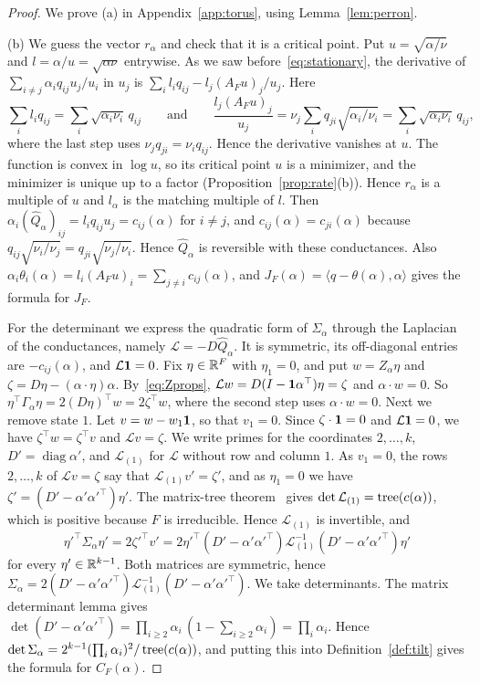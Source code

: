 \begin{proof}
We prove (a) in Appendix~\ref{app:torus}, using Lemma~\ref{lem:perron}.

(b) We guess the vector $r_\alpha$ and check that it is a critical point. Put
$u=\sqrt{\alpha/\nu}$ and $l=\alpha/u=\sqrt{\alpha\nu}$ entrywise. As we saw
before~\eqref{eq:stationary}, the derivative of $\sum_{i\ne j}\alpha_iq_{ij}u_j/u_i$ in $u_j$ is
$\sum_il_iq_{ij}-l_j(A_Fu)_j/u_j$. Here
\[
\sum_il_iq_{ij}=\sum_i\sqrt{\alpha_i\nu_i}\,q_{ij}\qquad\text{and}\qquad
\frac{l_j(A_Fu)_j}{u_j}=\nu_j\sum_iq_{ji}\sqrt{\alpha_i/\nu_i}
=\sum_i\sqrt{\alpha_i\nu_i}\,q_{ij},
\]
where the last step uses $\nu_jq_{ji}=\nu_iq_{ij}$. Hence the derivative vanishes at $u$. The
function is convex in $\log u$, so its critical point $u$ is a minimizer, and the minimizer is
unique up to a factor (Proposition~\ref{prop:rate}(b)). Hence $r_\alpha$ is a multiple of $u$ and
$l_\alpha$ is the matching multiple of $l$. Then
$\alpha_i(\widehat Q_\alpha)_{ij}=l_iq_{ij}u_j=c_{ij}(\alpha)$ for $i\ne j$, and
$c_{ij}(\alpha)=c_{ji}(\alpha)$ because $q_{ij}\sqrt{\nu_i/\nu_j}=q_{ji}\sqrt{\nu_j/\nu_i}$.
Hence $\widehat Q_\alpha$ is reversible with these conductances. Also
$\alpha_i\theta_i(\alpha)=l_i(A_Fu)_i=\sum_{j\ne i}c_{ij}(\alpha)$, and
$J_F(\alpha)=\langle q-\theta(\alpha),\alpha\rangle$ gives the formula for $J_F$.

For the determinant we express the quadratic form of $\Sigma_\alpha$ through the Laplacian of the
conductances, namely $\mathcal L=-D\widehat Q_\alpha$. It is symmetric, its off-diagonal entries
are $-c_{ij}(\alpha)$, and $\mathcal L\mathbf{1}=0$. Fix $\eta\in\mathbb{R}^F$ with $\eta_1=0$, and put
$w=Z_\alpha\eta$ and $\zeta=D\eta-(\alpha\cdot\eta)\alpha$. By~\eqref{eq:Zprops},
$\mathcal Lw=D(I-\mathbf{1}\alpha^\top)\eta=\zeta$ and $\alpha\cdot w=0$. So
$\eta^\top\Gamma_\alpha\eta=2(D\eta)^\top w=2\zeta^\top w$, where the second step uses
$\alpha\cdot w=0$. Next we remove state $1$. Let $v=w-w_1\mathbf{1}$,
so that $v_1=0$. Since $\zeta\cdot\mathbf{1}=0$ and $\mathcal L\mathbf{1}=0$, we have
$\zeta^\top w=\zeta^\top v$ and $\mathcal Lv=\zeta$. We write primes for the coordinates
$2,\dots,k$, $D'=\operatorname{diag}\alpha'$, and $\mathcal L_{(1)}$ for $\mathcal L$ without row
and column $1$. As $v_1=0$, the rows $2,\dots,k$ of $\mathcal Lv=\zeta$ say that
$\mathcal L_{(1)}v'=\zeta'$, and as $\eta_1=0$ we have $\zeta'=(D'-\alpha'\alpha'^\top)\eta'$. The
matrix-tree theorem~\cite{bollobas1998} gives $\det\mathcal L_{(1)}=\operatorname{tree}(c(\alpha))$, which is
positive because $F$ is irreducible. Hence $\mathcal L_{(1)}$ is invertible, and
\[
\eta'^\top\Sigma_\alpha\eta'=2\zeta'^\top v'
=2\eta'^\top(D'-\alpha'\alpha'^\top)\mathcal L_{(1)}^{-1}(D'-\alpha'\alpha'^\top)\eta'
\]
for every $\eta'\in\mathbb{R}^{k-1}$. Both matrices are symmetric, hence
$\Sigma_\alpha=2(D'-\alpha'\alpha'^\top)\mathcal L_{(1)}^{-1}(D'-\alpha'\alpha'^\top)$. We take
determinants. The matrix determinant lemma gives
$\det(D'-\alpha'\alpha'^\top)=\prod_{i\ge2}\alpha_i\,(1-\sum_{i\ge2}\alpha_i)=\prod_i\alpha_i$.
Hence $\det\Sigma_\alpha=2^{k-1}(\prod_i\alpha_i)^2/\operatorname{tree}(c(\alpha))$, and putting this into
Definition~\ref{def:tilt} gives the formula for $C_F(\alpha)$.
\end{proof}


